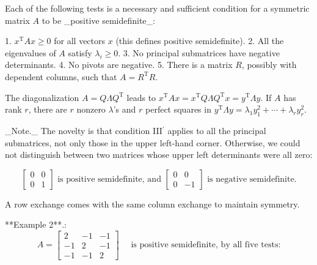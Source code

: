 Each of the following tests is a necessary and sufficient condition for a symmetric matrix \(A\) to be _positive semidefinite_:

1. \(x^{\mathrm{T}}Ax\geq 0\) for all vectors \(x\) (this defines positive semidefinite).
2. All the eigenvalues of \(A\) satisfy \(\lambda_{i}\geq 0\).
3. No principal submatrices have negative determinants.
4. No pivots are negative.
5. There is a matrix \(R\), possibly with dependent columns, such that \(A=R^{\mathrm{T}}R\).

The diagonalization \(A=Q\Lambda Q^{\mathrm{T}}\) leads to \(x^{\mathrm{T}}Ax=x^{\mathrm{T}}Q\Lambda Q^{\mathrm{T}}x=y^{\mathrm{T}}\Lambda y\). If \(A\) has rank \(r\), there are \(r\) nonzero \(\lambda\)'s and \(r\) perfect squares in \(y^{\mathrm{T}}\Lambda y=\lambda_{1}y_{1}^{2}+\cdots+\lambda_{r}y_{r}^{2}\).

_Note._ The novelty is that condition III\({}^{\prime}\) applies to all the principal submatrices, not only those in the upper left-hand corner. Otherwise, we could not distinguish between two matrices whose upper left determinants were all zero:

\[\begin{bmatrix}0&0\\ 0&1\end{bmatrix}\text{ is positive semidefinite, and }\begin{bmatrix}0&0\\ 0&-1\end{bmatrix}\text{ is negative semidefinite.}\]

A row exchange comes with the same column exchange to maintain symmetry.

**Example 2**.: \[A=\begin{bmatrix}2&-1&-1\\ -1&2&-1\\ -1&-1&2\end{bmatrix}\quad\text{ is positive {semi}definite, by all five tests:}\]

